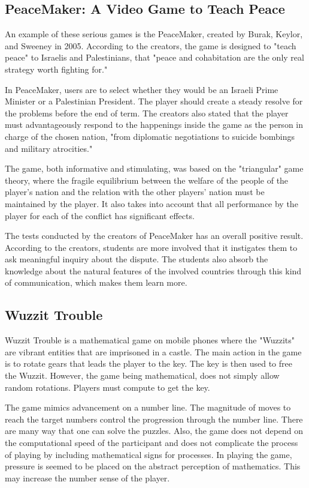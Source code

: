 \documentclass[journal]{./IEEE/IEEEtran}
\begin{document}
\subsection{PeaceMaker: A Video Game to Teach Peace \cite{burak2005peacemaker}}
An example of these serious games is the PeaceMaker, created by Burak, Keylor, and Sweeney in 2005. According to the creators, the game is designed to "teach peace" to Israelis and Palestinians, that "peace and cohabitation are the only real strategy worth fighting for."

In PeaceMaker, users are to select whether they would be an Israeli Prime Minister or a Palestinian President. The player should create a steady resolve for the problems before the end of term. The creators also stated that the player must advantageously respond to the happenings inside the game as the person in charge of the chosen nation, "from diplomatic negotiations to suicide bombings and military atrocities."

The game, both informative and stimulating, was based on the "triangular" game theory, where the fragile equilibrium between the welfare of the people of the player’s nation and the relation with the other players' nation must be maintained by the player. It also takes into account that all performance by the player for each of the conflict has significant effects.

The tests conducted by the creators of PeaceMaker has an overall positive result. According to the creators, students are more involved that it instigates them to ask meaningful inquiry about the dispute. The students also absorb the knowledge about the natural features of the involved countries through this kind of communication, which makes them learn more.

\subsection{Wuzzit Trouble \cite{pope2015wuzzit}}
Wuzzit Trouble is a mathematical game on mobile phones where the "Wuzzits" are vibrant entities that are imprisoned in a castle. The main action in the game is to rotate gears that leads the player to the key. The key is then used to free the Wuzzit. However, the game being mathematical, does not simply allow random rotations. Players must compute to get the key. 

The game mimics advancement on a number line. The magnitude of moves to reach the target numbers control the progression through the number line. There are many way that one can solve the puzzles. Also, the game does not depend on the computational speed of the participant and does not complicate the process of playing by including mathematical signs for processes. In playing the game, pressure is seemed to be placed on the abstract perception of mathematics. This may increase the number sense of the player.
\end{document}
